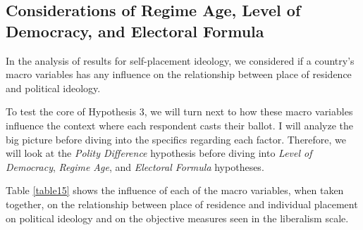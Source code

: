 \documentclass[12pt, titlepage]{article}
\newcommand\e{\emph}
\begin{document}
\subsection{Considerations of Regime Age, Level of Democracy, and Electoral Formula}

In the analysis of results for self-placement ideology, we considered if a country's macro variables has any influence on the relationship between place of residence and political ideology.

To test the core of Hypothesis 3, we will turn next to how these macro variables influence the context where each respondent casts their ballot. I will analyze the big picture before diving into the specifics regarding each factor. Therefore, we will look at the \e{Polity Difference} hypothesis before diving into \e{Level of Democracy}, \e{Regime Age}, and \e{Electoral Formula} hypotheses.

Table \ref{table15} shows the influence of each of the macro variables, when taken together, on the relationship between place of residence and individual placement on political ideology and on the objective measures seen in the liberalism scale.
\end{document}
